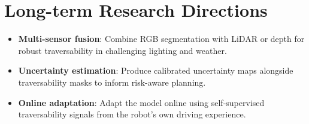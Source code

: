 \documentclass[12pt,a4paper]{report}
\begin{document}
\section{Long-term Research Directions}
\begin{itemize}[nosep]
  \item \textbf{Multi-sensor fusion}: Combine RGB segmentation with LiDAR or depth for robust traversability in challenging lighting and weather.
  \item \textbf{Uncertainty estimation}: Produce calibrated uncertainty maps alongside traversability masks to inform risk-aware planning.
  \item \textbf{Online adaptation}: Adapt the model online using self-supervised traversability signals from the robot's own driving experience.
\end{itemize}
\end{document}
